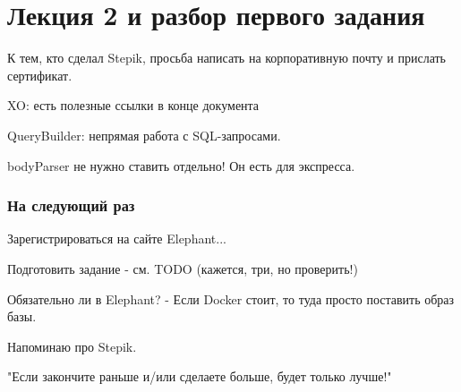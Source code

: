 \documentclass[main.tex]{subfiles}
\begin{document}
\section{Лекция 2 и разбор первого задания}

К тем, кто сделал Stepik, просьба написать на корпоративную почту и прислать сертификат.

XO:  есть полезные ссылки в конце документа

QueryBuilder: непрямая работа с SQL-запросами.

bodyParser не нужно ставить отдельно!
Он есть для экспресса.

\subsubsection{На следующий раз}

Зарегистрироваться на сайте Elephant...

Подготовить задание - см. TODO (кажется, три, но проверить!)

Обязательно ли в Elephant? - Если Docker стоит, то туда просто поставить образ базы.

Напоминаю про Stepik.

"Если закончите раньше и/или сделаете больше, будет только лучше!"
\end{document}
